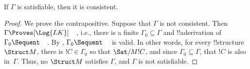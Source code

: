 \documentclass[../../../include/open-logic-section]{subfiles}
\begin{document}
\begin{cor}
If $\Gamma$ is satisfiable, then it is consistent.
\end{cor}

\begin{proof}
We prove the contrapositive.  Suppose that $\Gamma$ is not consistent.
Then $\Gamma \Proves[\Log{LK}] \quad$, i.e., there is a finite
$\Gamma_0 \subseteq \Gamma$ and !!a{derivation} of $\Gamma_0 \Sequent
\quad$.  By , $\Gamma_0 \Sequent \quad$
is valid.  In other words, for every !!{structure}~$\Struct M$, there
is $!C \in \Gamma_0$ so that $\Sat/{M}{!C}$, and since $\Gamma_0
\subseteq \Gamma$, that $!C$ is also in~$\Gamma$.  Thus, no $\Struct
M$ satisfies $\Gamma$, and $\Gamma$ is not satisfiable.
\end{proof}
\end{document}
